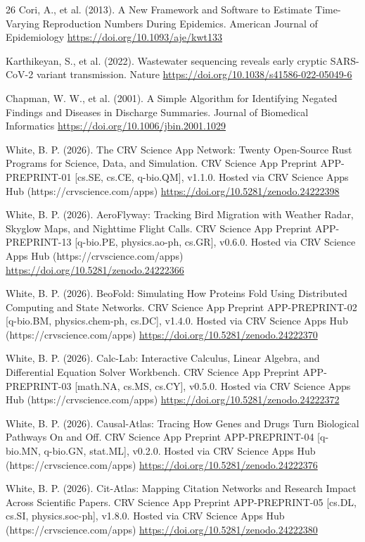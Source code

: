 \documentclass[10pt,letterpaper]{article}
\begin{document}
\begin{thebibliography}{26}
 Cori, A., et al. (2013). A New Framework and Software to Estimate Time-Varying Reproduction Numbers During Epidemics. American Journal of Epidemiology \url{https://doi.org/10.1093/aje/kwt133}

 Karthikeyan, S., et al. (2022). Wastewater sequencing reveals early cryptic SARS-CoV-2 variant transmission. Nature \url{https://doi.org/10.1038/s41586-022-05049-6}

 Chapman, W. W., et al. (2001). A Simple Algorithm for Identifying Negated Findings and Diseases in Discharge Summaries. Journal of Biomedical Informatics \url{https://doi.org/10.1006/jbin.2001.1029}

 White, B. P. (2026). The CRV Science App Network: Twenty Open-Source Rust Programs for Science, Data, and Simulation. CRV Science App Preprint APP-PREPRINT-01 [cs.SE, cs.CE, q-bio.QM], v1.1.0. Hosted via CRV Science Apps Hub (https://crvscience.com/apps) \url{https://doi.org/10.5281/zenodo.24222398}

 White, B. P. (2026). AeroFlyway: Tracking Bird Migration with Weather Radar, Skyglow Maps, and Nighttime Flight Calls. CRV Science App Preprint APP-PREPRINT-13 [q-bio.PE, physics.ao-ph, cs.GR], v0.6.0. Hosted via CRV Science Apps Hub (https://crvscience.com/apps) \url{https://doi.org/10.5281/zenodo.24222366}

 White, B. P. (2026). BeoFold: Simulating How Proteins Fold Using Distributed Computing and State Networks. CRV Science App Preprint APP-PREPRINT-02 [q-bio.BM, physics.chem-ph, cs.DC], v1.4.0. Hosted via CRV Science Apps Hub (https://crvscience.com/apps) \url{https://doi.org/10.5281/zenodo.24222370}

 White, B. P. (2026). Calc-Lab: Interactive Calculus, Linear Algebra, and Differential Equation Solver Workbench. CRV Science App Preprint APP-PREPRINT-03 [math.NA, cs.MS, cs.CY], v0.5.0. Hosted via CRV Science Apps Hub (https://crvscience.com/apps) \url{https://doi.org/10.5281/zenodo.24222372}

 White, B. P. (2026). Causal-Atlas: Tracing How Genes and Drugs Turn Biological Pathways On and Off. CRV Science App Preprint APP-PREPRINT-04 [q-bio.MN, q-bio.GN, stat.ML], v0.2.0. Hosted via CRV Science Apps Hub (https://crvscience.com/apps) \url{https://doi.org/10.5281/zenodo.24222376}

 White, B. P. (2026). Cit-Atlas: Mapping Citation Networks and Research Impact Across Scientific Papers. CRV Science App Preprint APP-PREPRINT-05 [cs.DL, cs.SI, physics.soc-ph], v1.8.0. Hosted via CRV Science Apps Hub (https://crvscience.com/apps) \url{https://doi.org/10.5281/zenodo.24222380}


\end{thebibliography}
\end{document}
